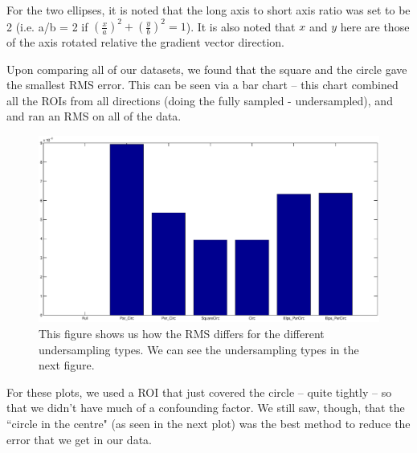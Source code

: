 \documentclass[11 pt]{article}
\begin{document}
      For the two ellipses, it is noted that the long axis to short axis ratio was set to be 2 (i.e. a/b = 2 if $\left(\frac{x}{a}\right)^2 + \left(\frac{y}{b}\right)^2 = 1$). It is also noted that $x$ and $y$ here are those of the axis rotated relative the gradient vector direction.
    
      Upon comparing all of our datasets, we found that the square and the circle gave the smallest RMS error. This can be seen via a bar chart -- this chart combined all the ROIs from all directions (doing the fully sampled - undersampled), and and ran an RMS on all of the data.
    
      \begin{figure}[!h]
        \centering
        \vspace{0pt}
        \setlength\fboxsep{0pt}
        \setlength\fboxrule{0.5pt}
        \includegraphics[trim = {10mm 0mm 10mm 0mm},clip,scale = 0.4] {Figs/numericalSims/nSimRMS.eps}
        \caption{This figure shows us how the RMS differs for the different undersampling types. We can see the undersampling types in the next figure.}
        \label{fig:RMSPhant}

        \end{figure}
    
      For these plots, we used a ROI that just covered the circle -- quite tightly -- so that we didn't have much of a confounding factor. We still saw, though, that the ``circle in the centre" (as seen in the next plot) was the best method to reduce the error that we get in our data.
    
\end{document}
